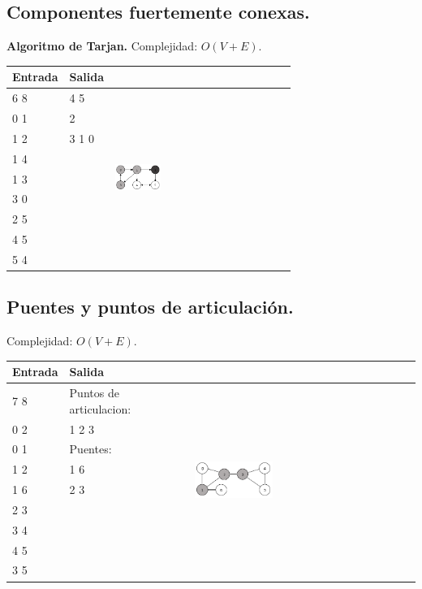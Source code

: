 \documentclass[11pt, letterpaper, twoside]{article}
\begin{document}
\subsection{Componentes fuertemente conexas.}

\textbf{Algoritmo de Tarjan.} Complejidad: $O(V + E)$.



\begin{tabular}{|p{4cm}|p{4cm}|p{7.5cm}|}
\hline
\textbf{Entrada} & \textbf{Salida} & \\ \hline
6 8 & 4 5 & \multirow{9}{*}{\includegraphics[width = 0.27\textwidth]{Grafos/Imagenes/StronglyConnected.png}} \\
0 1 & 2 & \\
1 2 & 3 1 0 & \\
1 4 & & \\ 
1 3 & & \\
3 0 & & \\
2 5 & & \\
4 5 & & \\
5 4 & & \\ \hline
\end{tabular}

\subsection{Puentes y puntos de articulación.}

Complejidad: $O(V + E)$.



\begin{tabular}{|p{4cm}|p{4cm}|p{7.5cm}|}
\hline
\textbf{Entrada} & \textbf{Salida} & \\ \hline
7 8 & Puntos de articulacion: & \multirow{9}{*}{\includegraphics[width = 0.36\textwidth]{Grafos/Imagenes/Bridge-Articulation.png}} \\
0 2 & 1 2 3 & \\
0 1 & Puentes: &\\
1 2 & 1 6 & \\ 
1 6 & 2 3 & \\
2 3 & & \\
3 4 & & \\
4 5 & & \\
3 5 & & \\ \hline
\end{tabular}
\end{document}
